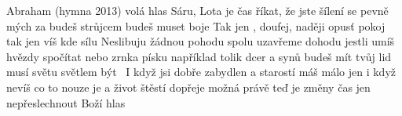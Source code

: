 \begin{TEXT}{Abraham (hymna 2013)}
\SLOKA {} volá  hlas\NL
{} Sáru, Lota  je čas\NL
{} říkat, že jste šílení\NL
{} se pevně mých za\NL
{} budeš strůjcem \NL
{} budeš muset  boje
\REFREN  Tak jen , doufej, naději \NL
{} opus\v{t} pokoj \NL
tak jen  víš kde sílu 
\SLOKA Neslibuju žádnou pohodu\NL
spolu uzavřeme dohodu\NL
jestli umíš hvězdy spočítat\NL
nebo zrnka písku například\NL
tolik dcer a synů budeš mít\NL
tvůj lid musí světu světlem být
\REFRENHRAJ \,
\SLOKA I když jsi dobře zabydlen\NL
a starostí máš málo jen\NL
i když nevíš co to nouze je\NL
a život štěstí dopřeje\NL
možná právě te\v{d} je změny čas\NL
jen nepřeslechnout Boží hlas
\REFRENHRAJ \,
\end{TEXT}
